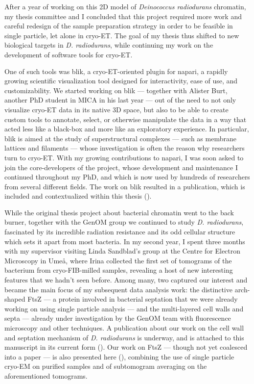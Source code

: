 After a year of working on this 2D model of \textit{Deinococcus radiodurans} chromatin, my thesis committee and I concluded that this project required more work and careful redesign of the sample preparation strategy in order to be feasible in single particle, let alone in cryo-ET.
The goal of my thesis thus shifted to new biological targets in \textit{D. radiodurans}, while continuing my work on the development of software tools for cryo-ET.

One of such tools was blik, a cryo-ET-oriented plugin for napari, a rapidly growing scientific visualization tool designed for interactivity, ease of use, and customizability.
We started working on blik --- together with Alister Burt, another PhD student in MICA in his last year --- out of the need to not only visualize cryo-ET data in its native 3D space, but also to be able to create custom tools to annotate, select, or otherwise manipulate the data in a way that acted less like a black-box and more like an exploratory experience.
In particular, blik is aimed at the study of superstructural complexes --- such as membrane lattices and filaments --- whose investigation is often the reason why researchers turn to cryo-ET.
With my growing contributions to napari, I was soon asked to join the core-developers of the project, whose development and maintenance I continued throughout my PhD, and which is now used by hundreds of researchers from several different fields.
The work on blik resulted in a publication, which is included and contextualized within this thesis ().

While the original thesis project about bacterial chromatin went to the back burner, together with the GenOM group we continued to study \textit{D. radiodurans}, fascinated by its incredible radiation resistance and its odd cellular structure which sets it apart from most bacteria.
In my second year, I spent three months with my supervisor visiting Linda Sandblad's group at the Centre for Electron Microscopy in Umeå, where Irina collected the first set of tomograms of the bacterium from cryo-FIB-milled samples, revealing a host of new interesting features that we hadn't seen before.
Among many, two captured our interest and became the main focus of my subsequent data analysis work: the distinctive arch-shaped FtsZ --- a protein involved in bacterial septation that we were already working on using single particle analysis --- and the multi-layered cell walls and septa --- already under investigation by the GenOM team with fluorescence microscopy and other techniques.
A publication about our work on the cell wall and septation mechanism of \textit{D. radiodurans} is underway, and is attached to this manuscript in its current form ().
Our work on FtsZ --- though not yet coalesced into a paper --- is also presented here (), combining the use of single particle cryo-EM on purified samples and of subtomogram averaging on the aforementioned tomograms.

